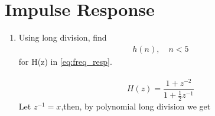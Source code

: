 \documentclass[journal,12pt,twocolumn]{IEEEtran}
\renewcommand\thesection{\arabic{section}}
\begin{document}
\section{Impulse Response}
\begin{enumerate}[label=\thesection.\arabic*]
	\item Using long division, 
find
		\begin{align}
			h(n), \quad n < 5
		\end{align}
		for H(z) in 
		\eqref{eq:freq_resp}.
	\\\solution\\
	\begin{equation}
		H(z) = \frac{1 + z^{-2}}{1 + \frac{1}{2} z^{-1}}
	\end{equation}
	Let $z^{-1} = x$,then, by polynomial long division we get
	

\end{enumerate}
\end{document}
